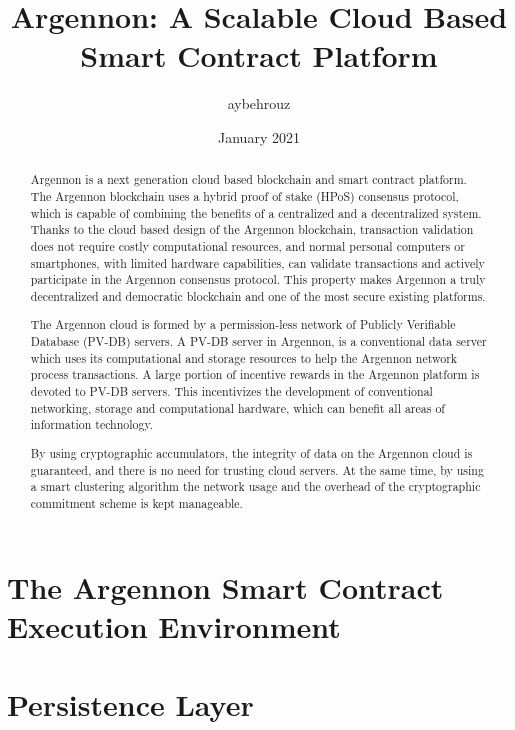 \documentclass[11pt, a4paper]{report}
\title{Argennon: A Scalable Cloud Based Smart Contract Platform}
\author{aybehrouz}
\date{January 2021}
\begin{document}
    \maketitle
    \begin{abstract}
        Argennon is a next generation cloud based blockchain and smart
        contract platform. The Argennon blockchain uses
        a hybrid proof of stake (HPoS) consensus protocol, which is capable of combining the benefits of
        a centralized and a decentralized system. Thanks to the cloud
        based design of the Argennon blockchain, transaction validation does not require costly
        computational resources, and normal personal computers or smartphones, with limited hardware capabilities, can
        validate transactions and actively
        participate in the Argennon consensus protocol. This property makes Argennon a truly decentralized and
        democratic blockchain and one of the most secure existing platforms.

        The Argennon cloud is formed by a permission-less network of Publicly Verifiable Database (PV-DB) servers. A
        PV-DB server in Argennon, is a conventional data server which uses its computational and
        storage resources to help the Argennon network process transactions. A large portion of incentive rewards in
        the Argennon platform is devoted to PV-DB servers. This incentivizes the development of conventional
        networking, storage and computational hardware, which can benefit all areas of information technology.

        By using cryptographic accumulators, the integrity of data on the Argennon cloud is guaranteed, and there
        is no need for trusting cloud servers. At the same time, by using a smart clustering algorithm the network usage
        and the overhead of the cryptographic commitment scheme is kept manageable.
    \end{abstract}
    \tableofcontents


    \chapter{The Argennon Smart Contract Execution Environment}\label{ch:AVM}
    


    \chapter{Persistence Layer}\label{ch:persistance}
    
\end{document}

